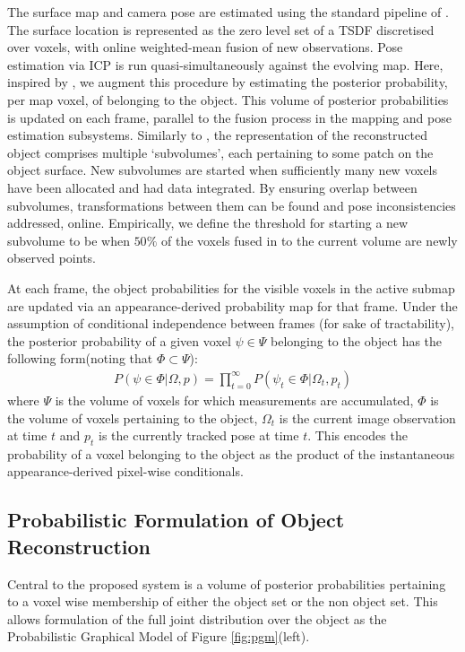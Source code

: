 The surface map and camera pose are estimated using the standard pipeline of \cite{Newcombe2011,Prisacariu2014}. The surface location is represented as the zero level set of a TSDF discretised over voxels, with online weighted-mean fusion of new observations. Pose estimation via ICP is run quasi-simultaneously against the evolving map. Here, inspired by \cite{Kolev2006}, we augment this procedure by estimating the posterior probability, per map voxel, of belonging to the object. This volume of posterior probabilities is updated on each frame, parallel to the fusion process in the mapping and pose estimation subsystems. Similarly to \cite{Kahler2016}, the representation of the reconstructed object comprises multiple `subvolumes', each pertaining to some patch on the object surface. New subvolumes are started when sufficiently many new voxels have been allocated and had data integrated. By ensuring overlap between subvolumes, transformations between them can be found and pose inconsistencies addressed, online. Empirically, we define the threshold for starting a new subvolume to be when $50\%$ of the voxels fused in to the current volume are newly observed points.

At each frame, the object probabilities for the visible voxels in the active submap are updated via an appearance-derived probability map for that frame. Under the assumption of conditional independence between frames (for sake of tractability), the posterior probability of a given voxel $\psi \in \Psi$ belonging to the object has the following form(noting that $\Phi \subset \Psi$):
\begin{equation}
\label{eq:membership}
\begin{split}
P(\psi \in \Phi | \Omega, p) = \prod_{t=0}^{\infty} P(\psi_{t} \in \Phi | \Omega_{t}, p_{t})
\end{split}
\end{equation}
where $\Psi$ is the volume of voxels for which measurements are accumulated, $\Phi$ 
is the volume of voxels pertaining to the object, $\Omega_{t}$ is the current image observation at time $t$ and $p_{t}$ is the 
currently tracked pose at time $t$.
This encodes the probability of a voxel belonging to the object as the product of the instantaneous appearance-derived pixel-wise conditionals.

\subsection{Probabilistic Formulation of Object Reconstruction}
Central to the proposed system is a volume of posterior probabilities pertaining to a voxel wise membership of either the 
object set or the non object set. This allows formulation of the full joint distribution over the object as the Probabilistic 
Graphical Model of Figure \ref{fig:pgm}(left).

